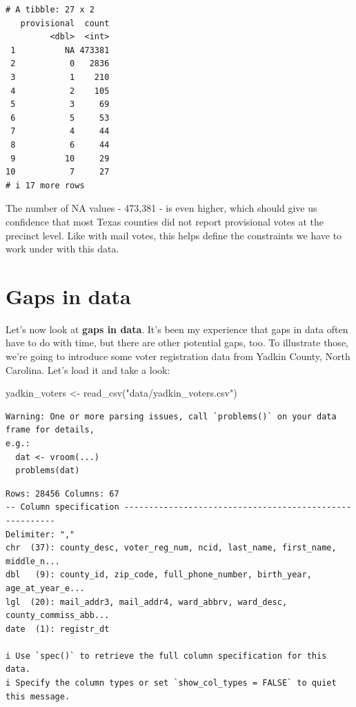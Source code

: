 \documentclass[
  letterpaper,
  DIV=11,
  numbers=noendperiod]{scrreprt}
\newenvironment{Shaded}{\begin{snugshade}}{\end{snugshade}}
\newcommand{\FunctionTok}[1]{\textcolor[rgb]{0.28,0.35,0.67}{#1}}
\newcommand{\NormalTok}[1]{\textcolor[rgb]{0.00,0.23,0.31}{#1}}
\newcommand{\OtherTok}[1]{\textcolor[rgb]{0.00,0.23,0.31}{#1}}
\newcommand{\StringTok}[1]{\textcolor[rgb]{0.13,0.47,0.30}{#1}}
\begin{document}
\begin{verbatim}
# A tibble: 27 x 2
   provisional  count
         <dbl>  <int>
 1          NA 473381
 2           0   2836
 3           1    210
 4           2    105
 5           3     69
 6           5     53
 7           4     44
 8           6     44
 9          10     29
10           7     27
# i 17 more rows
\end{verbatim}

The number of NA values - 473,381 - is even higher, which should give us
confidence that most Texas counties did not report provisional votes at
the precinct level. Like with mail votes, this helps define the
constraints we have to work under with this data.

\hypertarget{gaps-in-data}{%
\section{Gaps in data}\label{gaps-in-data}}

Let's now look at \textbf{gaps in data}. It's been my experience that
gaps in data often have to do with time, but there are other potential
gaps, too. To illustrate those, we're going to introduce some voter
registration data from Yadkin County, North Carolina. Let's load it and
take a look:

\begin{Shaded}
\begin{Highlighting}[]
\NormalTok{yadkin\_voters }\OtherTok{\textless{}{-}} \FunctionTok{read\_csv}\NormalTok{(}\StringTok{"data/yadkin\_voters.csv"}\NormalTok{)}
\end{Highlighting}
\end{Shaded}

\begin{verbatim}
Warning: One or more parsing issues, call `problems()` on your data frame for details,
e.g.:
  dat <- vroom(...)
  problems(dat)
\end{verbatim}

\begin{verbatim}
Rows: 28456 Columns: 67
-- Column specification --------------------------------------------------------
Delimiter: ","
chr  (37): county_desc, voter_reg_num, ncid, last_name, first_name, middle_n...
dbl   (9): county_id, zip_code, full_phone_number, birth_year, age_at_year_e...
lgl  (20): mail_addr3, mail_addr4, ward_abbrv, ward_desc, county_commiss_abb...
date  (1): registr_dt

i Use `spec()` to retrieve the full column specification for this data.
i Specify the column types or set `show_col_types = FALSE` to quiet this message.
\end{verbatim}
\end{document}
